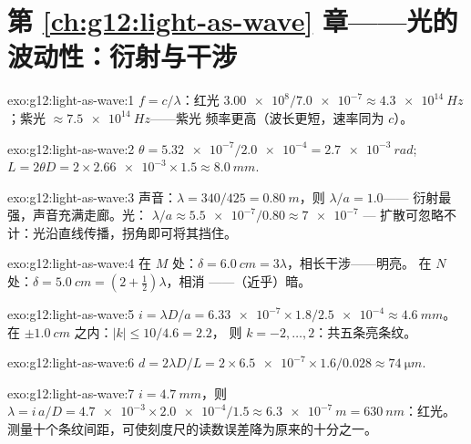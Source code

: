 \section*{第 \ref{ch:g12:light-as-wave} 章——光的波动性：衍射与干涉}

\begin{solution}{exo:g12:light-as-wave:1}
$f = c/\lambda$：红光 $\num{3.00e8}/\num{7.0e-7} \approx
\qty{4.3e14}{Hz}$；紫光 $\approx \qty{7.5e14}{Hz}$——紫光
频率更高（波长更短，速率同为 $c$）。
\end{solution}

\begin{solution}{exo:g12:light-as-wave:2}
$\theta = \num{5.32e-7}/\num{2.0e-4} = \qty{2.7e-3}{rad}$;
$L = 2\theta D = 2 \times \num{2.66e-3} \times 1.5 \approx
\qty{8.0}{mm}$.
\end{solution}

\begin{solution}{exo:g12:light-as-wave:3}
声音：$\lambda = 340/425 = \qty{0.80}{m}$，则 $\lambda/a = 1.0$——
衍射最强，声音充满走廊。光：
$\lambda/a \approx \num{5.5e-7}/0.80 \approx \num{7e-7}$ ---
扩散可忽略不计：光沿直线传播，拐角即可将其挡住。
\end{solution}

\begin{solution}{exo:g12:light-as-wave:4}
在 $M$ 处：$\delta = \qty{6.0}{cm} = 3\lambda$，相长干涉——明亮。
在 $N$ 处：$\delta = \qty{5.0}{cm} = (2 + \tfrac12)\lambda$，相消
——（近乎）暗。
\end{solution}

\begin{solution}{exo:g12:light-as-wave:5}
$i = \lambda D/a = \num{6.33e-7} \times 1.8/\num{2.5e-4} \approx
\qty{4.6}{mm}$。在 $\pm\qty{1.0}{cm}$ 之内：$|k| \leq 10/4.6 = 2.2$，
则 $k = -2, \dots, 2$：共五条亮条纹。
\end{solution}

\begin{solution}{exo:g12:light-as-wave:6}
$d = 2\lambda D/L = 2 \times \num{6.5e-7} \times 1.6/0.028 \approx
\qty{74}{\micro m}$.
\end{solution}

\begin{solution}{exo:g12:light-as-wave:7}
$i = \qty{4.7}{mm}$，则 $\lambda = i\,a/D = \num{4.7e-3} \times
\num{2.0e-4}/1.5 \approx \qty{6.3e-7}{m} = \qty{630}{nm}$：红光。
测量十个条纹间距，可使刻度尺的读数误差降为原来的十分之一。
\end{solution}

